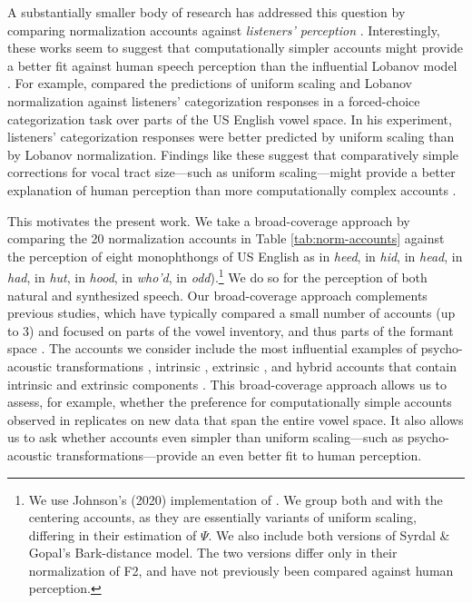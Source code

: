 \documentclass[preprint]{JASA}
\begin{document}
A substantially smaller body of research has addressed this question by comparing normalization accounts against \emph{listeners' perception} \citetext{\citealp{barreda-nearey2012}; \citealp{barreda2021}; \citealp{nearey1989}; \citealp{richter2017}; \citealp[for a review, see][]{whalen2016}}. Interestingly, these works seem to suggest that computationally simpler accounts might provide a better fit against human speech perception than the influential Lobanov model \citep{barreda2021, richter2017}. For example, \citet{barreda2021} compared the predictions of uniform scaling and Lobanov normalization against listeners' categorization responses in a forced-choice categorization task over parts of the US English vowel space. In his experiment, listeners' categorization responses were better predicted by uniform scaling than by Lobanov normalization. Findings like these suggest that comparatively simple corrections for vocal tract size---such as uniform scaling---might provide a better explanation of human perception than more computationally complex accounts \citep[see also][]{johnson2020, richter2017}.

This motivates the present work. We take a broad-coverage approach by comparing the 20 normalization accounts in Table \ref{tab:norm-accounts} against the perception of eight monophthongs of US English  as in \emph{heed},  in \emph{hid},  in \emph{head}, \textipa{\ae} in \emph{had},  in \emph{hut},  in \emph{hood},  in \emph{who'd},  in \emph{odd}).\footnote{We use Johnson's (2020) implementation of \citet{nordstrom-lindblom1975}. We group both \citet{nordstrom-lindblom1975} and \citet{johnson2020} with the centering accounts, as they are essentially variants of uniform scaling, differing in their estimation of \(\Psi\). We also include both versions of Syrdal \& Gopal's Bark-distance model. The two versions differ only in their normalization of F2, and have not previously been compared against human perception.} We do so for the perception of both natural and synthesized speech. Our broad-coverage approach complements previous studies, which have typically compared a small number of accounts (up to 3) and focused on parts of the vowel inventory, and thus parts of the formant space \citep[typically 2-4 vowels,][]{barreda-nearey2012, barreda2021, nearey1989, richter2017}. The accounts we consider include the most influential examples of psycho-acoustic transformations \citep{glasberg-moore1990, fant2002, stevens-volkmann1940, traunmuller1981}, intrinsic \citep{syrdal-gopal1986}, extrinsic \citep{gerstman1968, johnson2020, lobanov1971, mcmurray-jongman2011, nearey1978, nordstrom-lindblom1975}, and hybrid accounts that contain intrinsic and extrinsic components \citep{miller1989}. This broad-coverage approach allows us to assess, for example, whether the preference for computationally simple accounts observed in \citet{barreda2021} replicates on new data that span the entire vowel space. It also allows us to ask whether accounts even simpler than uniform scaling---such as psycho-acoustic transformations---provide an even better fit to human perception.
\end{document}
